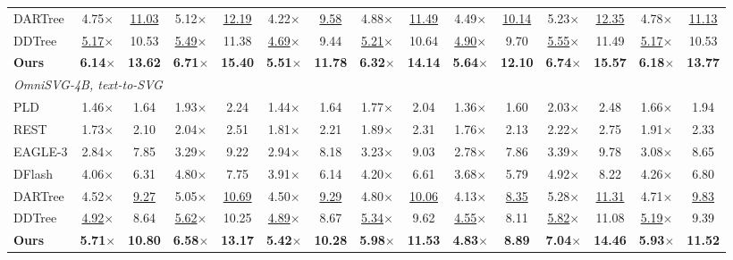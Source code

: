 \begin{table}[t]
\begin{tabular*}{\textwidth}{@{\extracolsep{\fill}}l*{14}{c}@{}}
DARTree & 4.75$\times$ & \underline{11.03} & 5.12$\times$ & \underline{12.19} & 4.22$\times$ & \underline{9.58} & 4.88$\times$ & \underline{11.49} & 4.49$\times$ & \underline{10.14} & 5.23$\times$ & \underline{12.35} & 4.78$\times$ & \underline{11.13} \\
DDTree & \underline{5.17}$\times$ & 10.53 & \underline{5.49}$\times$ & 11.38 & \underline{4.69}$\times$ & 9.44 & \underline{5.21}$\times$ & 10.64 & \underline{4.90}$\times$ & 9.70 & \underline{5.55}$\times$ & 11.49 & \underline{5.17}$\times$ & 10.53 \\
\textbf{Ours} & \textbf{6.14}$\times$ & \textbf{13.62} & \textbf{6.71}$\times$ & \textbf{15.40} & \textbf{5.51}$\times$ & \textbf{11.78} & \textbf{6.32}$\times$ & \textbf{14.14} & \textbf{5.64}$\times$ & \textbf{12.10} & \textbf{6.74}$\times$ & \textbf{15.57} & \textbf{6.18}$\times$ & \textbf{13.77} \\
\midrule
\multicolumn{15}{l}{\textit{OmniSVG-4B, text-to-SVG}} \\
PLD & 1.46$\times$ & 1.64 & 1.93$\times$ & 2.24 & 1.44$\times$ & 1.64 & 1.77$\times$ & 2.04 & 1.36$\times$ & 1.60 & 2.03$\times$ & 2.48 & 1.66$\times$ & 1.94 \\
REST & 1.73$\times$ & 2.10 & 2.04$\times$ & 2.51 & 1.81$\times$ & 2.21 & 1.89$\times$ & 2.31 & 1.76$\times$ & 2.13 & 2.22$\times$ & 2.75 & 1.91$\times$ & 2.33 \\
EAGLE-3 & 2.84$\times$ & 7.85 & 3.29$\times$ & 9.22 & 2.94$\times$ & 8.18 & 3.23$\times$ & 9.03 & 2.78$\times$ & 7.86 & 3.39$\times$ & 9.78 & 3.08$\times$ & 8.65 \\
DFlash & 4.06$\times$ & 6.31 & 4.80$\times$ & 7.75 & 3.91$\times$ & 6.14 & 4.20$\times$ & 6.61 & 3.68$\times$ & 5.79 & 4.92$\times$ & 8.22 & 4.26$\times$ & 6.80 \\
DARTree & 4.52$\times$ & \underline{9.27} & 5.05$\times$ & \underline{10.69} & 4.50$\times$ & \underline{9.29} & 4.80$\times$ & \underline{10.06} & 4.13$\times$ & \underline{8.35} & 5.28$\times$ & \underline{11.31} & 4.71$\times$ & \underline{9.83} \\
DDTree & \underline{4.92}$\times$ & 8.64 & \underline{5.62}$\times$ & 10.25 & \underline{4.89}$\times$ & 8.67 & \underline{5.34}$\times$ & 9.62 & \underline{4.55}$\times$ & 8.11 & \underline{5.82}$\times$ & 11.08 & \underline{5.19}$\times$ & 9.39 \\
\textbf{Ours} & \textbf{5.71}$\times$ & \textbf{10.80} & \textbf{6.58}$\times$ & \textbf{13.17} & \textbf{5.42}$\times$ & \textbf{10.28} & \textbf{5.98}$\times$ & \textbf{11.53} & \textbf{4.83}$\times$ & \textbf{8.89} & \textbf{7.04}$\times$ & \textbf{14.46} & \textbf{5.93}$\times$ & \textbf{11.52} \\

\end{tabular*}
\end{table}
